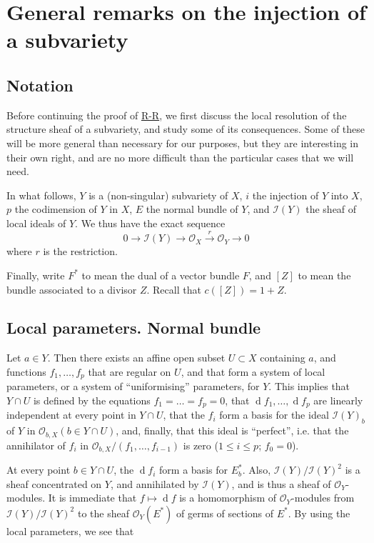 \documentclass{article}
\newcommand{\scr}[1]{{\mathscr{#1}}}
\newcommand{\dd}{\operatorname{d}\!}
\renewcommand{\leq}{\leqslant}
\newcommand{\oldpage}[1]{\marginpar{\footnotesize$\Big\vert$ \textit{p.~#1}}}
\begin{document}
\section{General remarks on the injection of a subvariety}
\label{section10}


\subsection{Notation}
\label{subsection10a}

\oldpage{120}
Before continuing the proof of \hyperref[theoremriemannroch]{R-R}, we first discuss the local resolution of the structure sheaf of a subvariety, and study some of its consequences.
Some of these will be more general than necessary for our purposes, but they are interesting in their own right, and are no more difficult than the particular cases that we will need.

In what follows, $Y$ is a (non-singular) subvariety of $X$, $i$ the injection of $Y$ into $X$, $p$ the codimension of $Y$ in $X$, $E$ the normal bundle of $Y$, and $\scr{I}(Y)$ the sheaf of local ideals of $Y$.
We thus have the exact sequence
\[
\label{section10aequation1}
  0 \to \scr{I}(Y) \to \scr{O}_X \xrightarrow{r} \scr{O}_Y \to 0
  \tag{1}
\]
where $r$ is the restriction.

Finally, write $F^*$ to mean the dual of a vector bundle $F$, and $[Z]$ to mean the bundle associated to a divisor $Z$.
Recall that $c([Z])=1+Z$.


\subsection{Local parameters. Normal bundle}
\label{subsection10b}

Let $a\in Y$.
Then there exists an affine open subset $U\subset X$ containing $a$, and functions $f_1,\ldots,f_p$ that are regular on $U$, and that form a system of local parameters, or a system of ``uniformising'' parameters, for $Y$.
This implies that $Y\cap U$ is defined by the equations $f_1=\ldots=f_p=0$, that $\dd f_1,\ldots,\dd f_p$ are linearly independent at every point in $Y\cap U$, that the $f_i$ form a basis for the ideal $\scr{I}(Y)_b$ of $Y$ in $\scr{O}_{b,X}(b\in Y\cap U)$, and, finally, that this ideal is ``perfect'', i.e. that the annihilator of $f_i$ in $\scr{O}_{b,X}/(f_1,\ldots,f_{i-1})$ is zero ($1\leq i\leq p$; $f_0=0$).

At every point $b\in Y\cap U$, the $\dd f_i$ form a basis for $E_b^*$.
Also, $\scr{I}(Y)/\scr{I}(Y)^2$ is a sheaf concentrated on $Y$, and annihilated by $\scr{I}(Y)$, and is thus a sheaf of $\scr{O}_Y$-modules.
It is immediate that $f\mapsto\dd f$ is a homomorphism of $\scr{O}_Y$-modules from $\scr{I}(Y)/\scr{I}(Y)^2$ to the sheaf $\scr{O}_Y(E^*)$ of germs of sections of $E^*$.
By using the local parameters, we see that
\end{document}
